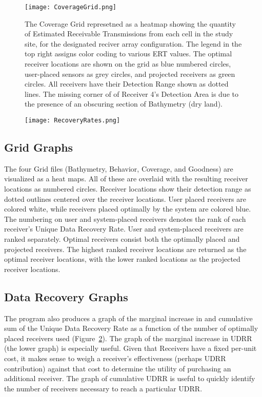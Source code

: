 \begin{figure}[t]
	\texttt{[image: CoverageGrid.png]}
	\caption{The Coverage Grid represetned as a heatmap showing the quantity of Estimated Receivable Transmissions from each cell in the study site, for the designated reciver array configuration.  The legend in the top right assigns color coding to various ERT values.  The optimal receiver locations are shown on the grid as blue numbered circles, user-placed sensors as grey circles, and projected receivers as green circles.  All receivers have their Detection Range shown as dotted lines.  The missing corner of of Receiver 4's Detection Area is due to the presence of an obscuring section of Bathymetry (dry land).}\label{coverageGraph}
\end{figure}

\begin{figure}[t]
	\texttt{[image: RecoveryRates.png]}
	\caption{} \label{recoveryGraph}
\end{figure}
\subsection{Grid Graphs}
The four Grid files (Bathymetry, Behavior, Coverage, and Goodness) are visualized as a heat maps.  All of these are overlaid with the resulting receiver locations as numbered circles.  Receiver locations show their detection range as dotted outlines centered over the receiver locations.  User placed receivers are colored white, while receivers placed optimally by the system are colored blue.  The numbering on user and system-placed receivers denotes the rank of each receiver's Unique Data Recovery Rate.  User and system-placed receivers are ranked separately.  Optimal receivers consist both the optimally placed and projected receivers.  The highest ranked receiver locations are returned as the optimal receiver locations, with the lower ranked locations as the projected receiver locations.


\subsection{Data Recovery Graphs}
The program also produces a graph of the marginal increase in and cumulative sum of the Unique Data Recovery Rate as a function of the number of optimally placed receivers used (Figure~\ref{recoveryGraph}).  The graph of the marginal increase in UDRR (the lower graph) is especially useful.  Given that Receivers have a fixed per-unit cost, it makes sense to weigh a receiver's effectiveness (perhaps UDRR contribution) against that cost to determine the utility of purchasing an additional receiver.  The graph of cumulative UDRR is useful to quickly identify the number of receivers necessary to reach a particular UDRR.

